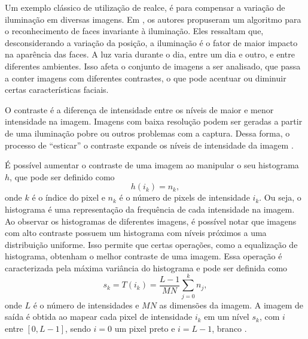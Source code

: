 Um exemplo clássico de utilização de realce, é para compensar a variação de iluminação em diversas imagens. Em , os autores propuseram um algoritmo para o reconhecimento de faces invariante à iluminação. Eles ressaltam que, desconsiderando a variação da posição, a iluminação é o fator de maior impacto na aparência das faces. A luz varia durante o dia, entre um dia e outro, e entre diferentes ambientes. Isso afeta o conjunto de imagens a ser analisado, que passa a conter imagens com diferentes contrastes, o que pode acentuar ou diminuir certas características faciais.

O contraste é a diferença de intensidade entre os níveis de maior e menor intensidade na imagem. Imagens com baixa resolução podem ser geradas a partir de uma iluminação pobre ou outros problemas com a captura. Dessa forma, o processo de ``esticar'' o contraste expande os níveis de intensidade da imagem \cite{Gonzalez2007}.

É possível aumentar o contraste de uma imagem ao manipular o seu histograma $h$, que pode ser definido como
\begin{equation*}
h(i_k) = n_k,
\end{equation*}
\noindent onde $k$ é o índice do pixel e $n_k$ é o número de pixels de intensidade $i_k$. Ou seja, o histograma é uma representação da frequência de cada intensidade na imagem. Ao observar os histogramas de diferentes imagens, é possível notar que imagens com alto contraste possuem um histograma com níveis próximos a uma distribuição uniforme. Isso permite que certas operações, como a equalização de histograma, obtenham o melhor contraste de uma imagem. Essa operação é caracterizada pela máxima variância do histograma e pode ser definida como
\begin{equation}
s_k = T(i_k) = \frac{L-1}{MN} \sum_{j=0}^{k}n_j,
\end{equation}
\noindent onde $L$ é o número de intensidades e $MN$ as dimensões da imagem. A imagem de saída é obtida ao mapear cada pixel de intensidade $i_k$ em um nível $s_k$, com $i$ entre $[0,L-1]$, sendo $i = 0$ um pixel preto e $i = L-1$, branco \cite{Gonzalez2007}.


